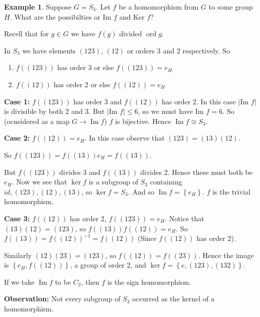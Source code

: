 \documentclass{article}
\theoremstyle{definition}
\newtheorem*{exmp}{Example}
\DeclareMathOperator{\Ima}{Im}
\DeclareMathOperator{\ord}{\text{ord}}
\begin{document}
\begin{exmp}
  Suppose $G=S_3$. Let $f$ be a homomorphism from $G$ to some group $H$. What are the possibilties or $\text{Im }f$ and $\text{Ker }f$?

  Recell that for $g \in G$ we have $f(g)$ divided $\ord g$.

  In $S_3$ we have elements $(123)$, $(12)$ or orders 3 and 2 respectively. So
  \begin{enumerate}
    \item 
  $f\left( (123) \right)$ has order 3 or else $f\left( (123) \right)=e_H$ 
    \item 
  $f\left( (12) \right)$ has order 2 or else $f\left( (12) \right)=e_H$ 
  \end{enumerate}

  \textbf{Case 1:} $f\left( (123) \right)$ has order 3 and $f\left(  (12)\right)$ has order 2. In this case $|\text{Im }f|$ is divisible by both 2 and 3. But $|\text{Im }f| \leq 6$, so we must have $\text{Im } f=6$. So (ocnsidered as a map $G \rightarrow \Ima f$) $f$ is bijective. Hence $\Ima f \cong S_3$.

  \textbf{Case 2:} $f\left( (12) \right)=e_H$. In this case observe that $(123)=(13)(12)$.

  So $f\left( (123) \right)=f\left( (13) \right)e_H=f\left( (13) \right)$.

  But $f\left( (123) \right)$ divides 3 and $f\left( (13) \right)$ divides 2. Hence these must both be $e_H$. Now we see that $\ker f$ is a subgroup of $S_3$ containing $id, (123), (12), (13)$, so $\ker f=S_3$. And so $\Ima f = \left\{ e_H \right\}$. $f$ is the trivial homomorphism.

  \textbf{Case 3:} $f\left( (12) \right)$ has order 2, $f\left( (123) \right)=e_H$. Notice that $(13)(12)=(123)$, so $f\left( (13) \right)f\left( (12) \right)=e_H$. So $f\left( (13) \right)=f\left( (12) \right)^{-1}=f\left( (12) \right)$ (Since $f\left( (12) \right)$ has order 2).

  Similarly $(12)(23)=(123)$, so $f\left( (12) \right)=f\left( (23) \right)$. Hence the image is $\left\{ e_H,f\left( (12) \right) \right\}$, a group of order 2, and $\ker f=\left\{ e,(123),(132) \right\}$.

  If we take $\Ima f$ to be $C_2$, then $f$ is the sign homomorphism.

  \textbf{Observation:} Not every subgroup of $S_3$ occurred as the kernel of a homomorphism.
\end{exmp}
\end{document}

